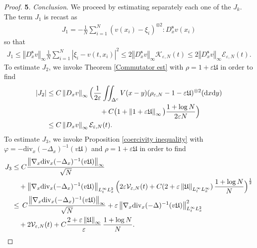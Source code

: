 \documentclass[11pt,reqno]{amsart}
\numberwithin{equation}{section}
\def\dd{{\rm d}}
\begin{document}
\begin{proof}
\smallskip
\textbf{5}. \textit{Conclusion}.
We proceed by estimating separately each one of the $J_{k}$. 
The term $J_{1}$ is recast as 
\begin{align*}
J_{1}=-\frac{1}{N}\sum_{i=1}^{N}(v(x_{i})-\xi_{i})^{\otimes 2}:D^{\mathbf{s}}_{x}v(x_{i})    
\end{align*} 
so that
\begin{align}
J_{1}\leq \left\Vert D^{\mathbf{s}}_{x}v\right\Vert_{\infty}\frac{1}{N}\sum_{i=1}^{N} \left\vert \xi_{i}-v(t,x_{i})\right\vert^{2} \leq 2\left\Vert D^{\mathbf{s}}_{x}v\right\Vert_{\infty} \mathcal{K}_{\varepsilon,N}(t)\leq 2\left\Vert D^{\mathbf{s}}_{x}v\right\Vert_{\infty}\mathcal{E}_{\varepsilon,N}(t).\label{J1 est}
\end{align}
To estimate $J_{2}$, we invoke Theorem \ref{Commutator est} 
with $\rho=1+\varepsilon\mathfrak{U}$ in order to find 
\begin{align}
|J_{2}|&\leq C\left\Vert D_{x} v\right\Vert_{\infty}
\Big(\frac{1}{2\varepsilon}\iint_{\Delta^{c}}V(x-y)
(\rho_{\varepsilon,N}-1-\varepsilon\mathfrak{U})^{\otimes 2}(\dd x\dd y)\notag\\
&
\hspace{2.7cm}
+C\big(1+\left\Vert 1+\varepsilon\mathfrak{U}\right\Vert_{\infty}\big)
\frac{1+\log N}{2\varepsilon N}\Big) \notag\\
&\leq  C\left\Vert D_{x}v\right\Vert_{\infty}\mathcal{E}_{\varepsilon,N}(t).
\label{J2 est}
\end{align}
To estimate $J_{3}$,  
we invoke Proposition \ref{coercivity inequality} with $\varphi=-\mathrm{div}_{x}(-\Delta_{x})^{-1}(v\mathfrak{U})$ and $\rho=1+\varepsilon\mathfrak{U}$ in order to find
\begin{align}
J_{3}&\leq C\frac{\left\Vert\nabla_{x}\mathrm{div}_{x}(-\Delta_{x})^{-1}(v\mathfrak{U})\right\Vert_{\infty}}{\sqrt{N}} \notag\\
&\quad+\left\Vert \nabla_{x}\mathrm{div}_{x}(-\Delta_{x})^{-1}(v\mathfrak{U})\right\Vert_{L^{\infty}_{t}L^{2}_{x}}
\Big(2\varepsilon\mathcal{V}_{\varepsilon,N}(t)+C(2+\varepsilon\left\Vert \mathfrak{U}\right\Vert_{L^{\infty}_{t}L^{\infty}_{x}})\,\frac{1+\log N}{N}\Big)^{\frac{1}{2}} \notag\\
&\leq\, C\frac{\left\Vert\nabla_{x}\mathrm{div}_{x}(-\Delta_{x})^{-1}(v\mathfrak{U})\right\Vert_{\infty}}{\sqrt{N}}+\varepsilon\left\Vert \nabla_{x}\mathrm{div}_{x}(-\Delta)^{-1}(v\mathfrak{U})\right\Vert_{L^{\infty}_{t}L^{2}_{x}}^{2} \notag\\
&\quad+2\mathcal{V}_{\varepsilon,N}(t)+C\frac{2+\varepsilon\left\Vert \mathfrak{U}\right\Vert_{\infty}}{\varepsilon}\,\frac{1+\log N}{N}.

\end{align}
\end{proof}
\end{document}
